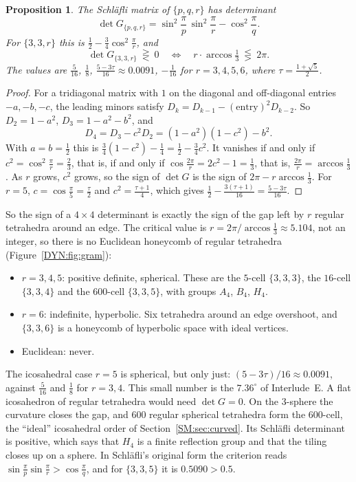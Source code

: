 \documentclass[11pt,openany]{book}
\theoremstyle{plain}
\newtheorem{proposition}[theorem]{Proposition}
\theoremstyle{definition}
\theoremstyle{remark}
\begin{document}
\begin{proposition}\label{DYN:prop:gram335}
The Schl\"afli matrix of $\{p,q,r\}$ has determinant
\[
  \det G_{\{p,q,r\}}=\sin^2\frac\pi p\,\sin^2\frac\pi r-\cos^2\frac\pi q .
\]
For $\{3,3,r\}$ this is $\frac12-\frac34\cos^2\frac\pi r$, and
\[
  \det G_{\{3,3,r\}}\ \gtreqless\ 0\quad\iff\quad r\cdot\arccos\tfrac13\ \lesseqgtr\ 2\pi .
\]
The values are $\frac5{16}$, $\frac18$, $\frac{5-3\tau}{16}\approx0.0091$, $-\frac1{16}$ for
$r=3,4,5,6$, where $\tau=\frac{1+\sqrt5}2$.
\end{proposition}

\begin{proof}
For a tridiagonal matrix with $1$ on the diagonal and off-diagonal entries $-a,-b,-c$, the leading
minors satisfy $D_k=D_{k-1}-(\text{entry})^2D_{k-2}$. So $D_2=1-a^2$, $D_3=1-a^2-b^2$, and
\[
  D_4=D_3-c^2D_2=(1-a^2)(1-c^2)-b^2 .
\]
With $a=b=\frac12$ this is $\frac34(1-c^2)-\frac14=\frac12-\frac34c^2$. It vanishes if and only if
$c^2=\cos^2\frac\pi r=\frac23$, that is, if and only if $\cos\frac{2\pi}r=2c^2-1=\frac13$, that is,
$\frac{2\pi}r=\arccos\frac13$. As $r$ grows, $c^2$ grows, so the sign of $\det G$ is the sign of
$2\pi-r\arccos\frac13$. For $r=5$, $c=\cos\frac\pi5=\frac\tau2$ and $c^2=\frac{\tau+1}4$, which gives
$\frac12-\frac{3(\tau+1)}{16}=\frac{5-3\tau}{16}$.
\end{proof}

So the sign of a $4\times4$ determinant is exactly the sign of the gap left by $r$ regular tetrahedra
around an edge. The critical value is $r=2\pi/\arccos\frac13\approx5.104$, not an integer, so
there is no Euclidean honeycomb of regular tetrahedra (Figure~\ref{DYN:fig:gram}):
\begin{itemize}[nosep]
\item $r=3,4,5$: positive definite, spherical. These are the $5$-cell $\{3,3,3\}$, the $16$-cell
  $\{3,3,4\}$ and the $600$-cell $\{3,3,5\}$, with groups $A_4$, $B_4$, $H_4$.
\item $r=6$: indefinite, hyperbolic. Six tetrahedra around an edge overshoot, and $\{3,3,6\}$ is a
  honeycomb of hyperbolic space with ideal vertices.
\item Euclidean: never.
\end{itemize}
The icosahedral case $r=5$ is spherical, but only just: $(5-3\tau)/16\approx0.0091$, against
$\frac5{16}$ and $\frac18$ for $r=3,4$. This small number is the $7.36^\circ$ of Interlude~E. A flat
icosahedron of regular tetrahedra would need $\det G=0$. On the $3$-sphere the curvature closes the
gap, and $600$ regular spherical tetrahedra form the $600$-cell, the ``ideal'' icosahedral order of
Section~\ref{SM:sec:curved}. Its Schl\"afli determinant is positive, which says that $H_4$ is a finite
reflection group and that the tiling closes up on a sphere. In Schl\"afli's original form the criterion
reads $\sin\frac\pi p\sin\frac\pi r>\cos\frac\pi q$, and for $\{3,3,5\}$ it is
$0.5090>0.5$.
\end{document}
